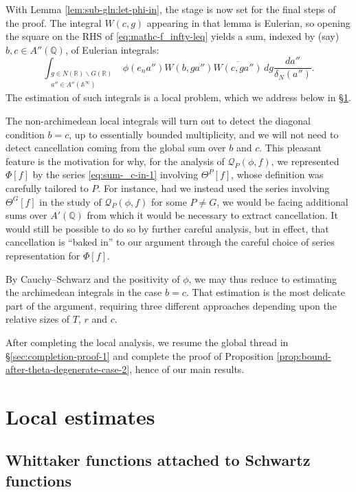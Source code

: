 With Lemma \ref{lem:sub-gln:let-phi-in}, the stage is now set for the final steps of the proof.  The integral $W(c,g)$ appearing in that lemma is Eulerian, so opening the square on the RHS of \eqref{eq:mathc-f_infty-leq} yields a sum, indexed by (say) $b,c \in A''(\mathbb{Q})$, of Eulerian integrals:
\begin{equation*}
  \int_{
    \substack{
      g \in N(\mathbb{R}) \backslash G(\mathbb{R}) \\
      a'' \in A''(\mathbb{A}^\infty)
    }
  }
  \phi(e_n a'')
  W(b, g a'')
  \overline{W(c, g a'')}
  \, d g \frac{d a''}{\delta_N(a'')}.
\end{equation*}
The estimation of such integrals is a local problem, which we address below in \S\ref{sec:local-estimates}.

The non-archimedean local integrals will turn out to detect the diagonal condition $b = c$, up to essentially bounded multiplicity, and we will not need to detect cancellation coming from the global sum over $b$ and $c$.  This pleasant feature is the motivation for why, for the analysis of $\mathcal{Q}_P(\phi, f)$, we represented $\Phi[f]$ by the series \eqref{eq:sum-_c-in-1} involving $\Theta^P[f]$, whose definition was carefully tailored to $P$.  For instance, had we instead used the series involving $\Theta^G[f]$ in the study of $\mathcal{Q}_P(\phi,f)$ for some $P \neq G$, we would be facing additional sums over $A'(\mathbb{Q})$ from which it would be necessary to extract cancellation.  It would still be possible to do so by further careful analysis, but in effect, that cancellation is ``baked in'' to our argument through the careful choice of series representation for $\Phi[f]$.

By Cauchy--Schwarz and the positivity of $\phi$, we may thus reduce to estimating the archimedean integrals in the case $b=c$.  That estimation is the most delicate part of the argument, requiring three different approaches depending upon the relative sizes of $T$, $r$ and $c$.

After completing the local analysis, we resume the global thread in \S\ref{sec:completion-proof-1} and complete the proof of Proposition \ref{prop:bound-after-theta-degenerate-case-2}, hence of our main results.


\section{Local estimates}\label{sec:local-estimates}

\subsection{Whittaker functions attached to Schwartz functions}\label{sec:whitt-funct-attach}

